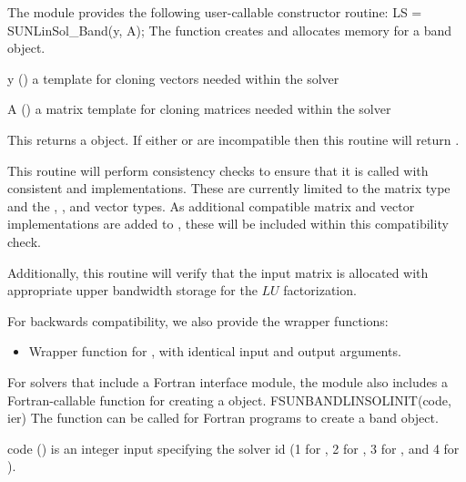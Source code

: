 The module {\sunlinsolband} provides the following user-callable constructor routine: 
{
  LS = SUNLinSol\_Band(y, A);
}
{
  The function  creates and allocates memory for
  a band  object.
}
{
  \begin{args}[y]
  \item[y] ()
    a template for cloning vectors needed within the solver
  \item[A] ()
    a {\sunmatband} matrix template for cloning matrices needed
    within the solver 
  \end{args}
}
{
  This returns a  object.  If either  or
   are incompatible then this routine will return .
}
{
  This routine will perform consistency checks to ensure that it is
  called with consistent {\nvector} and {\sunmatrix} implementations.
  These are currently limited to the {\sunmatdense} matrix type and
  the {\nvecs}, {\nvecopenmp}, and {\nvecpthreads} vector types.  As
  additional compatible matrix and vector implementations are added to
  {\sundials}, these will be included within this compatibility check.

  Additionally, this routine will verify that the input matrix 
  is allocated with appropriate upper bandwidth storage for the $LU$
  factorization.
}
For backwards compatibility, we also provide the wrapper functions:
\begin{itemize}

\item {}

  Wrapper function for , with identical input and
  output arguments.

\end{itemize}
For solvers that include a Fortran interface module, the {\sunlinsolband}
module also includes a Fortran-callable function for creating a
 object.
{
  FSUNBANDLINSOLINIT(code, ier)
}
{
  The function  can be called for Fortran programs
  to create a band  object.
}
{
  \begin{args}[code]
  \item[code] ()
    is an integer input specifying the solver id (1 for {\cvode}, 2
    for {\ida}, 3 for {\kinsol}, and 4 for {\arkode}).
  \end{args}
}
